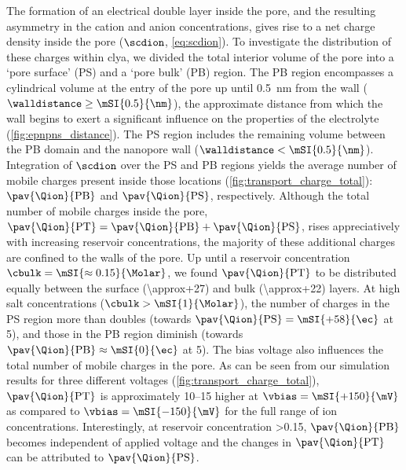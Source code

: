 The formation of an electrical double layer inside the pore, and the resulting asymmetry in the cation and
anion concentrations, gives rise to a net charge density inside the pore ($\scdion$, \cref{eq:scdion}). To
investigate the distribution of these charges within \gls{clya}, we divided the total interior volume of the
pore into a `pore surface' (PS) and a `pore bulk' (PB) region. The PB region encompasses a cylindrical volume
at the entry of the pore up until \SI{0.5}{\nm} from the wall ($\walldistance \ge \mSI{0.5}{\nm}$), the
approximate distance from which the wall begins to exert a significant influence on the properties of the
electrolyte (\cref{fig:epnpns_distance}). The PS region includes the remaining volume between the PB domain
and the nanopore wall ($\walldistance < \mSI{0.5}{\nm}$). Integration of $\scdion$ over the PS and PB regions
yields the average number of mobile charges present inside those locations
(\cref{fig:transport_charge_total}): $\pav{\Qion}{\text{PB}}$ and $\pav{\Qion}{\text{PS}}$, respectively.
Although the total number of mobile charges inside the pore, $\pav{\Qion}{\text{PT}} = \pav{\Qion}{\text{PB}}
+ \pav{\Qion}{\text{PS}}$, rises appreciatively with increasing reservoir concentrations, the majority of
these additional charges are confined to the walls of the pore. Up until a reservoir concentration
$\cbulk=\mSI{\approx0.15}{\Molar}$, we found $\pav{\Qion}{\text{PT}}$ to be distributed equally between the
surface (\SI{\approx+27}{\ec}) and bulk (\SI{\approx+22}{\ec}) layers. At high salt concentrations ($\cbulk >
\mSI{1}{\Molar}$), the number of charges in the PS region more than doubles (towards
$\pav{\Qion}{\text{PS}}=\mSI{+58}{\ec}$ at \SI{5}{\Molar}), and those in the PB region diminish (towards
$\pav{\Qion}{\text{PB}} \approx \mSI{0}{\ec}$ at \SI{5}{\Molar}). The bias voltage also influences the total
number of mobile charges in the pore. As can be seen from our simulation results for three different voltages
(\cref{fig:transport_charge_total}), $\pav{\Qion}{\text{PT}}$ is approximately \SIrange{+10}{+15}{\ec} higher
at $\vbias = \mSI{+150}{\mV}$ as compared to $\vbias = \mSI{-150}{\mV}$ for the full range of ion
concentrations. Interestingly, at reservoir concentration \SI{>0.15}{\Molar}, $\pav{\Qion}{\text{PB}}$ becomes
independent of applied voltage and the changes in $\pav{\Qion}{\text{PT}}$ can be attributed to
$\pav{\Qion}{\text{PS}}$.

